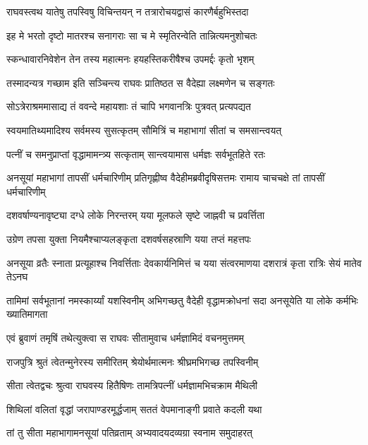 
\twolineshloka
{राघवस्त्वथ यातेषु तपस्विषु विचिन्तयन्}
{न तत्रारोचयद्वासं कारणैर्बहुभिस्तदा} %

\twolineshloka
{इह मे भरतो दृष्टो मातरश्च सनागराः}
{सा च मे स्मृतिरन्वेति तान्नित्यमनुशोचतः} %

\twolineshloka
{स्कन्धावारनिवेशेन तेन तस्य महात्मनः}
{हयहस्तिकरीषैश्च उपमर्द्दः कृतो भृशम्} %

\twolineshloka
{तस्मादन्यत्र गच्छाम इति सञ्चिन्त्य राघवः}
{प्रातिष्ठत स वैदेह्या लक्ष्मणेन च सङ्गतः} %

\twolineshloka
{सोऽत्रेराश्रममासाद्य तं ववन्दे महायशाः}
{तं चापि भगवानत्रिः पुत्रवत् प्रत्यपद्यत} %

\twolineshloka
{स्वयमातिथ्यमादिश्य सर्वमस्य सुसत्कृतम्}
{सौमित्रिं च महाभागां सीतां च समसान्त्वयत्} %

\twolineshloka
{पत्नीं च समनुप्राप्तां वृद्धामामन्त्र्य सत्कृताम्}
{सान्त्वयामास धर्मज्ञः सर्वभूतहिते रतः} %

\threelineshloka
{अनसूयां महाभागां तापसीं धर्मचारिणीम्}
{प्रतिगृह्णीष्व वैदेहीमब्रवीदृषिसत्तमः}
{रामाय चाचचक्षे तां तापसीं धर्मचारिणीम्} %

\twolineshloka
{दशवर्षाण्यनावृष्ट्या दग्धे लोके निरन्तरम्}
{यया मूलफले सृष्टे जाह्नवी च प्रवर्त्तिता} %

\twolineshloka
{उग्रेण तपसा युक्ता नियमैश्चाप्यलङ्कृता}
{दशवर्षसहस्राणि यया तप्तं महत्तपः} %

\threelineshloka
{अनसूया व्रतैः स्नाता प्रत्यूहाश्च निवर्त्तिताः}
{देवकार्यनिमित्तं च यया संत्वरमाणया}
{दशरात्रं कृता रात्रिः सेयं मातेव तेऽनघ} %

\threelineshloka
{तामिमां सर्वभूतानां नमस्कार्य्यां यशस्विनीम्}
{अभिगच्छतु वैदेही वृद्धामक्रोधनां सदा}
{अनसूयेति या लोके कर्मभिः ख्यातिमागता} %

\twolineshloka
{एवं ब्रुवाणं तमृषिं तथेत्युक्त्वा स राघवः}
{सीतामुवाच धर्मज्ञामिदं वचनमुत्तमम्} %

\twolineshloka
{राजपुत्रि श्रुतं त्वेतन्मुनेरस्य समीरितम्}
{श्रेयोर्थमात्मनः श्रीघ्रमभिगच्छ तपस्विनीम्} %

\twolineshloka
{सीता त्वेतद्वचः श्रुत्वा राघवस्य हितैषिणः}
{तामत्रिपत्नीं धर्मज्ञामभिचक्राम मैथिली} %

\twolineshloka
{शिथिलां वलितां वृद्धां जरापाण्डरमूर्द्धजाम्}
{सततं वेपमानाङ्गी प्रवाते कदली यथा} %

\twolineshloka
{तां तु सीता महाभागामनसूयां पतिव्रताम्}
{अभ्यवादयदव्यग्रा स्वनाम समुदाहरत्} %

